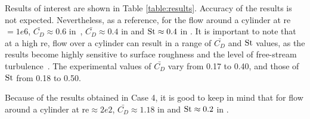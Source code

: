 Results of interest are shown in Table \ref{table:results}. Accuracy of the results is not expected. Nevertheless, as a reference, for the flow around a cylinder at \gls{re}$= 1e6$, $\bar{C_D} \approx 0.6$ in~\cite{achenbach1968distribution}, $\bar{C_D} \approx 0.4$ in \cite{roshko1961experiments} and $\mathrm{St} \approx  0.4$ in \cite{roshko1961experiments}. It is important to note that at a high \gls{re}, flow over a cylinder can result in a range of $\bar{C_D}$ and $\mathrm{St}$ values, as the results become highly sensitive to surface roughness and the level of free-stream turbulence~\cite{zdravkovich1997flow}. The experimental values of $\bar{C_D}$ vary from 0.17 to 0.40, and those of $\mathrm{St}$ from 0.18 to 0.50.

Because of the results obtained in Case 4, it is good to keep in mind that for flow around a cylinder at \gls{re}$\approx 2e2$, $\bar{C_D} \approx 1.18$ in \cite{roshko1961experiments} and $\mathrm{St} \approx  0.2$ in \cite{roshko1961experiments}. 


